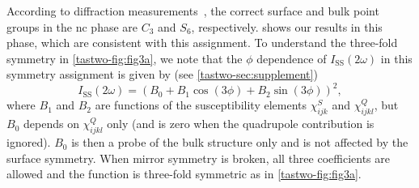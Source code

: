 According to diffraction measurements~\citep{fung_application_1980}, the correct surface and bulk point groups in the \gls{nc} phase are $C_3$ and $S_6$, respectively.
 shows our results in this phase, which are consistent with this assignment.
To understand the three-fold symmetry in \cref{tastwo-fig:fig3a}, we note that the $\phi$ dependence of $I_\mathrm{SS}(2\omega)$ in this symmetry assignment is given by (see \cref{tastwo-sec:supplement})
\begin{equation}
\label{tastwo-eq:qintensityequation}
I_\mathrm{SS}(2\omega) = (B_0+B_1\cos{(3\phi)}+B_2\sin{(3\phi)})^2,
\end{equation}
where $B_1$ and $B_2$ are functions of the susceptibility elements $\chi^S_{ijk}$ and $\chi^Q_{ijkl}$, but $B_0$ depends on $\chi^Q_{ijkl}$ only (and is zero when the quadrupole contribution is ignored).
$B_0$ is then a probe of the bulk structure only and is not affected by the surface symmetry.
When mirror symmetry is broken, all three coefficients are allowed and the function is three-fold symmetric as in \cref{tastwo-fig:fig3a}.

